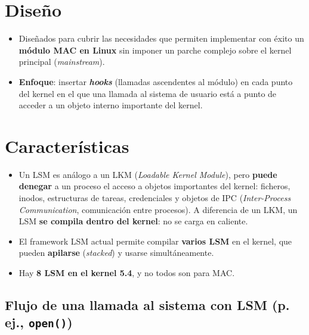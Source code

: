 \documentclass[11pt,a4paper]{report}
\begin{document}
\section{Diseño}
 
\begin{itemize}
  \item Diseñados para cubrir las necesidades que permiten implementar con éxito un \textbf{módulo MAC en Linux} sin imponer un parche complejo sobre el kernel principal (\emph{mainstream}).
  \item \textbf{Enfoque}: insertar \textbf{\emph{hooks}} (llamadas ascendentes al módulo) en cada punto del kernel en el que una llamada al sistema de usuario está a punto de acceder a un objeto interno importante del kernel.
\end{itemize}
 
\section{Características}
 
\begin{itemize}
  \item Un LSM es análogo a un LKM (\emph{Loadable Kernel Module}), pero \textbf{puede denegar} a un proceso el acceso a objetos importantes del kernel: ficheros, inodos, estructuras de tareas, credenciales y objetos de IPC (\emph{Inter-Process Communication}, comunicación entre procesos). A diferencia de un LKM, un LSM \textbf{se compila dentro del kernel}: no se carga en caliente.
  \item El framework LSM actual permite compilar \textbf{varios LSM} en el kernel, que pueden \textbf{apilarse} (\emph{stacked}) y usarse simultáneamente.
  \item Hay \textbf{8 LSM en el kernel 5.4}, y no todos son para MAC.
\end{itemize}
 
\subsection*{Flujo de una llamada al sistema con LSM (p.\,ej., \texttt{open()})}
 
\end{document}
